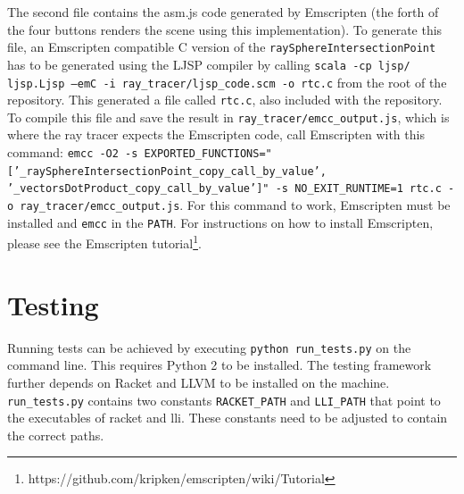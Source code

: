 \documentclass[11pt]{report}
\begin{document}
The second file contains the asm.js code generated by Emscripten (the forth of the four buttons renders the scene using this implementation). To generate this file, an Emscripten compatible C version of the \texttt{raySphereIntersectionPoint} has to be generated using the LJSP compiler by calling \texttt{scala -cp ljsp/ ljsp.Ljsp --emC -i ray_tracer/ljsp_code.scm -o rtc.c} from the root of the repository. This generated a file called \texttt{rtc.c}, also included with the repository. To compile this file and save the result in \texttt{ray_tracer/emcc_output.js}, which is where the ray tracer expects the Emscripten code, call Emscripten with this command: \texttt{emcc -O2 -s EXPORTED_FUNCTIONS="['_raySphereIntersectionPoint_copy_call_by_value', '_vectorsDotProduct_copy_call_by_value']" -s NO_EXIT_RUNTIME=1 rtc.c -o ray_tracer/emcc_output.js}. For this command to work, Emscripten must be installed and \texttt{emcc} in the \texttt{PATH}. For instructions on how to install Emscripten, please see the Emscripten tutorial\footnote{https://github.com/kripken/emscripten/wiki/Tutorial}.

\section{Testing}
Running tests can be achieved by executing \texttt{python run_tests.py} on the command line. This requires Python 2 to be installed. The testing framework further depends on Racket and LLVM to be installed on the machine. \texttt{run_tests.py} contains two constants \texttt{RACKET_PATH} and \texttt{LLI_PATH} that point to the executables of racket and lli. These constants need to be adjusted to contain the correct paths.

\newpage
\end{document}
